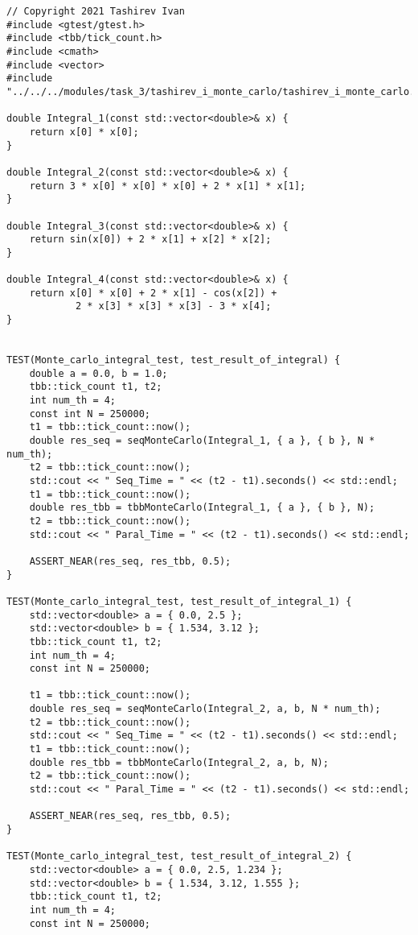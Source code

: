 \documentclass{report}
\begin{document}
\begin{lstlisting}
// Copyright 2021 Tashirev Ivan
#include <gtest/gtest.h>
#include <tbb/tick_count.h>
#include <cmath>
#include <vector>
#include "../../../modules/task_3/tashirev_i_monte_carlo/tashirev_i_monte_carlo.h"

double Integral_1(const std::vector<double>& x) {
    return x[0] * x[0];
}

double Integral_2(const std::vector<double>& x) {
    return 3 * x[0] * x[0] * x[0] + 2 * x[1] * x[1];
}

double Integral_3(const std::vector<double>& x) {
    return sin(x[0]) + 2 * x[1] + x[2] * x[2];
}

double Integral_4(const std::vector<double>& x) {
    return x[0] * x[0] + 2 * x[1] - cos(x[2]) +
            2 * x[3] * x[3] * x[3] - 3 * x[4];
}


TEST(Monte_carlo_integral_test, test_result_of_integral) {
    double a = 0.0, b = 1.0;
    tbb::tick_count t1, t2;
    int num_th = 4;
    const int N = 250000;
    t1 = tbb::tick_count::now();
    double res_seq = seqMonteCarlo(Integral_1, { a }, { b }, N * num_th);
    t2 = tbb::tick_count::now();
    std::cout << " Seq_Time = " << (t2 - t1).seconds() << std::endl;
    t1 = tbb::tick_count::now();
    double res_tbb = tbbMonteCarlo(Integral_1, { a }, { b }, N);
    t2 = tbb::tick_count::now();
    std::cout << " Paral_Time = " << (t2 - t1).seconds() << std::endl;

    ASSERT_NEAR(res_seq, res_tbb, 0.5);
}

TEST(Monte_carlo_integral_test, test_result_of_integral_1) {
    std::vector<double> a = { 0.0, 2.5 };
    std::vector<double> b = { 1.534, 3.12 };
    tbb::tick_count t1, t2;
    int num_th = 4;
    const int N = 250000;

    t1 = tbb::tick_count::now();
    double res_seq = seqMonteCarlo(Integral_2, a, b, N * num_th);
    t2 = tbb::tick_count::now();
    std::cout << " Seq_Time = " << (t2 - t1).seconds() << std::endl;
    t1 = tbb::tick_count::now();
    double res_tbb = tbbMonteCarlo(Integral_2, a, b, N);
    t2 = tbb::tick_count::now();
    std::cout << " Paral_Time = " << (t2 - t1).seconds() << std::endl;

    ASSERT_NEAR(res_seq, res_tbb, 0.5);
}

TEST(Monte_carlo_integral_test, test_result_of_integral_2) {
    std::vector<double> a = { 0.0, 2.5, 1.234 };
    std::vector<double> b = { 1.534, 3.12, 1.555 };
    tbb::tick_count t1, t2;
    int num_th = 4;
    const int N = 250000;


\end{lstlisting}
\end{document}
